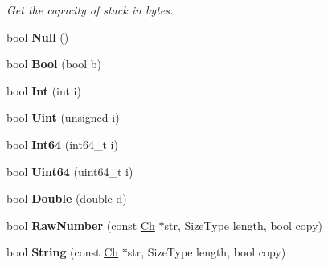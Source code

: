 \begin{DoxyCompactItemize}
\begin{DoxyCompactList}\small\item\em Get the capacity of stack in bytes. \end{DoxyCompactList}\item 
bool {\bfseries Null} ()\hypertarget{class_generic_document_a87dc7f66b2b92660b8a43546733f9df2}{}\label{class_generic_document_a87dc7f66b2b92660b8a43546733f9df2}

\item 
bool {\bfseries Bool} (bool b)\hypertarget{class_generic_document_a4c44780642518dd34bd241a1ea0ceaf1}{}\label{class_generic_document_a4c44780642518dd34bd241a1ea0ceaf1}

\item 
bool {\bfseries Int} (int i)\hypertarget{class_generic_document_a8cc986266becaa268474c607489745c7}{}\label{class_generic_document_a8cc986266becaa268474c607489745c7}

\item 
bool {\bfseries Uint} (unsigned i)\hypertarget{class_generic_document_a530dd899a04a00ba74f52507b488d2c1}{}\label{class_generic_document_a530dd899a04a00ba74f52507b488d2c1}

\item 
bool {\bfseries Int64} (int64\+\_\+t i)\hypertarget{class_generic_document_a934b1b7a7ed89917615a5410db77a942}{}\label{class_generic_document_a934b1b7a7ed89917615a5410db77a942}

\item 
bool {\bfseries Uint64} (uint64\+\_\+t i)\hypertarget{class_generic_document_a50ac3451a1afd0ce248dcc023d5e09e8}{}\label{class_generic_document_a50ac3451a1afd0ce248dcc023d5e09e8}

\item 
bool {\bfseries Double} (double d)\hypertarget{class_generic_document_a934bf7a5d1ff062ab079756d842e4f6b}{}\label{class_generic_document_a934bf7a5d1ff062ab079756d842e4f6b}

\item 
bool {\bfseries Raw\+Number} (const \hyperlink{class_generic_value_ade0e0ce64ccd5d852da57a35e720bafb}{Ch} $\ast$str, Size\+Type length, bool copy)\hypertarget{class_generic_document_af703994dec5af6ef049a24b5243aceab}{}\label{class_generic_document_af703994dec5af6ef049a24b5243aceab}

\item 
bool {\bfseries String} (const \hyperlink{class_generic_value_ade0e0ce64ccd5d852da57a35e720bafb}{Ch} $\ast$str, Size\+Type length, bool copy)\hypertarget{class_generic_document_ad319fcc9e13606b6795424b9374a7398}{}\label{class_generic_document_ad319fcc9e13606b6795424b9374a7398}


\end{DoxyCompactItemize}
